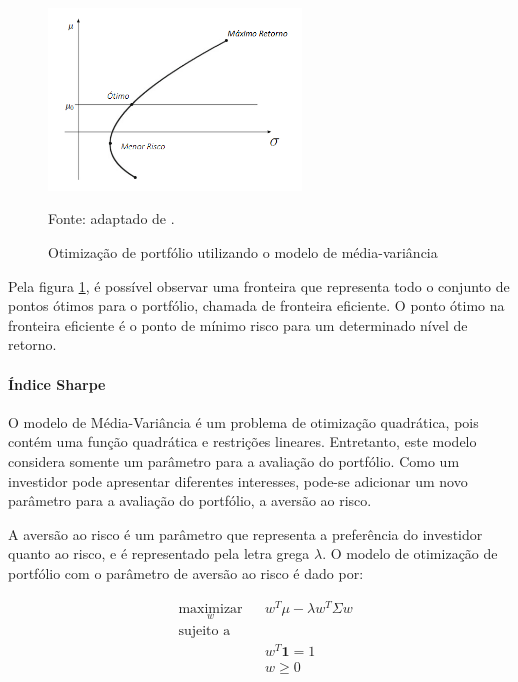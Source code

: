                     \begin{figure}[H]
                        \centering
                        \caption{Otimização de portfólio utilizando o modelo de média-variância}
                        \label{fig:mínimo_risco}
                        \includegraphics[width=0.6\textwidth]{imagens/minimo_risco.png}
                        \par \footnotesize Fonte: adaptado de .
                    \end{figure}

                    \ipar Pela figura \ref{fig:mínimo_risco}, é possível observar uma fronteira que representa todo o conjunto de pontos ótimos para o portfólio, chamada de fronteira eficiente. O ponto ótimo na fronteira eficiente é o ponto de mínimo risco para um determinado nível de retorno.

                \paragraph{Índice Sharpe}
                    
                    \ipar O modelo de Média-Variância é um problema de otimização quadrática, pois contém uma função quadrática e restrições lineares. Entretanto, este modelo considera somente um parâmetro para a avaliação do portfólio. Como um investidor pode apresentar diferentes interesses, pode-se adicionar um novo parâmetro para a avaliação do portfólio, a aversão ao risco. 

                    \ipar A aversão ao risco é um parâmetro que representa a preferência do investidor quanto ao risco, e é representado pela letra grega $\lambda$. O modelo de otimização de portfólio com o parâmetro de aversão ao risco é dado por:

                    \begin{equation}
                        \label{eq:aversao}
                        \begin{aligned}
                            & \underset{w}{\text{maximizar}}
                            & & w^T \mu - \lambda w^T \Sigma w \\
                            & \text{sujeito a} \\
                            & & & w^T \mathbf{1} = 1 \\
                            & & & w \geq 0
                        \end{aligned}
                    \end{equation}

